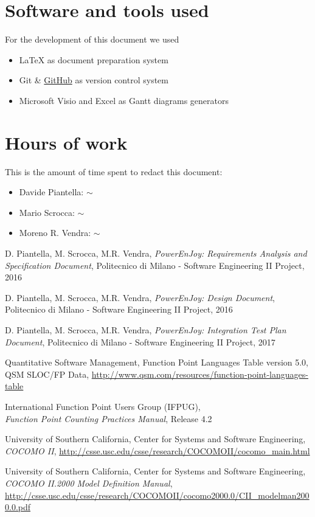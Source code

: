 \begin{appendices}

	\section{Software and tools used}
	For the development of this document we used
	\begin{itemize}
		\item \LaTeX{} as document preparation system
		\item Git \& \href{http://github.com}{GitHub} as version control system
		\item Microsoft Visio and Excel as Gantt diagrams generators
	\end{itemize}
	
	\section{Hours of work}
	This is the amount of time spent to redact this document:
	\begin{itemize}
		\item Davide Piantella: $\sim$ 
		\item Mario Scrocca: $\sim$ 
		\item Moreno R. Vendra: $\sim$ 
	\end{itemize}
	
\end{appendices}


\begin{thebibliography}{9}

D. Piantella, M. Scrocca, M.R. Vendra, \emph{PowerEnJoy: Requirements Analysis and Specification Document}, Politecnico di Milano - Software Engineering II Project, 2016

D. Piantella, M. Scrocca, M.R. Vendra, \emph{PowerEnJoy: Design Document}, Politecnico di Milano - Software Engineering II Project, 2016

D. Piantella, M. Scrocca, M.R. Vendra, \emph{PowerEnJoy: Integration Test Plan Document}, Politecnico di Milano - Software Engineering II Project, 2017

Quantitative Software Management, Function Point Languages Table version 5.0, QSM SLOC/FP Data, \url{http://www.qsm.com/resources/function-point-languages-table}

International Function Point Users Group (IFPUG),
\\\emph{Function Point Counting Practices Manual}, Release 4.2 

University of Southern California, Center for Systems and Software Engineering, \emph{COCOMO II}, \url{http://csse.usc.edu/csse/research/COCOMOII/cocomo_main.html}

University of Southern California, Center for Systems and Software Engineering, \emph{COCOMO II.2000 Model Definition Manual}, \url{http://csse.usc.edu/csse/research/COCOMOII/cocomo2000.0/CII_modelman2000.0.pdf}

\end{thebibliography}